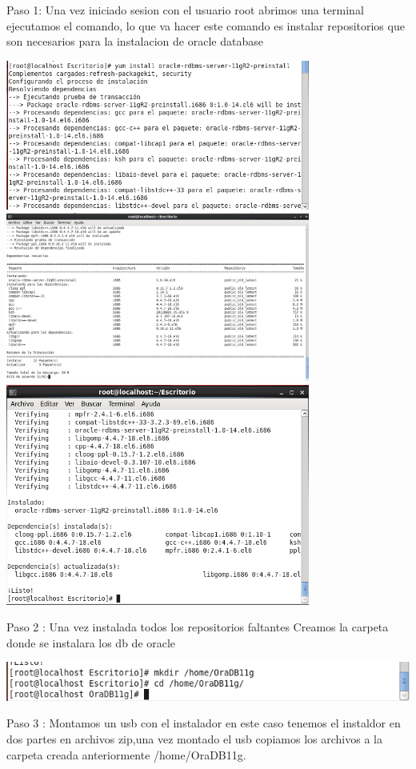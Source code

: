 \documentclass[12pt,letterpaper]{article}
\begin{document}
Paso 1: Una vez iniciado sesion con el usuario root abrimos una terminal ejecutamos el comando, lo que va hacer este comando es instalar repositorios que son necesarios para la instalacion de oracle database
\begin{center}
\includegraphics[width=10cm]{./oraclelinux/1.png}
\includegraphics[width=10cm]{./oraclelinux/2.png}
\includegraphics[width=10cm]{./oraclelinux/3.png}
\end{center}

Paso 2 : Una vez instalada todos los repositorios faltantes Creamos la carpeta donde se instalara los db de oracle

\begin{center}
\includegraphics[width=15cm]{./oraclelinux/4.png}
\end{center}
Paso 3 : Montamos un usb con el instalador en este caso tenemos el instaldor en dos partes en archivos zip,una vez montado el usb copiamos los archivos a la carpeta creada anteriormente /home/OraDB11g.
\end{document}
